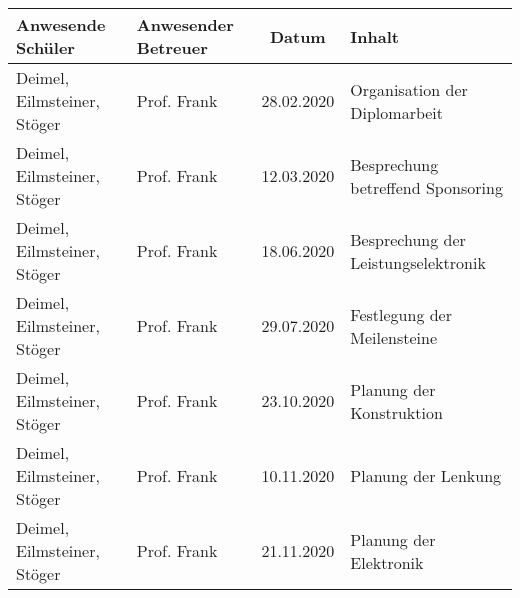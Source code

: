 \begin{tabular}[h]{|M{.25\textwidth}|M{.16\textwidth}|c|M{.37\textwidth}|}
    \hline
    \textbf{Anwesende Schüler} & \textbf{Anwesender Betreuer} & \textbf{Datum}  & \textbf{Inhalt} \\
    \hline
    Deimel, Eilmsteiner, Stöger & Prof. Frank & 28.02.2020 & Organisation der Diplomarbeit \\
    \hline
    Deimel, Eilmsteiner, Stöger & Prof. Frank & 12.03.2020 & Besprechung betreffend Sponsoring \\
    \hline
    Deimel, Eilmsteiner, Stöger & Prof. Frank & 18.06.2020 & Besprechung der Leistungselektronik \\
    \hline
    Deimel, Eilmsteiner, Stöger & Prof. Frank & 29.07.2020 & Festlegung der Meilensteine \\
    \hline
    Deimel, Eilmsteiner, Stöger & Prof. Frank & 23.10.2020 & Planung der Konstruktion \\
    \hline
    Deimel, Eilmsteiner, Stöger & Prof. Frank & 10.11.2020 & Planung der Lenkung \\
    \hline 
    Deimel, Eilmsteiner, Stöger & Prof. Frank & 21.11.2020 & Planung der Elektronik \\
    \hline
\end{tabular}